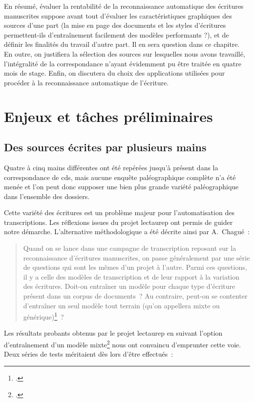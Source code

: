 \documentclass[a4paper,12pt,twoside]{book}
\begin{document}
			En résumé, évaluer la rentabilité de la reconnaissance automatique des écritures manuscrites suppose avant tout d'évaluer les caractéristiques graphiques des sources d'une part (la mise en page des documents et les styles d'écritures permettent-ils d'entraînement facilement des modèles performants ?), et de définir les finalités du travail d'autre part. Il en sera question dans ce chapitre. En outre, on justifiera la sélection des sources sur lesquelles nous avons travaillé, l'intégralité de la correspondance n'ayant évidemment pu être traitée en quatre mois de stage. Enfin, on discutera du choix des applications utilisées pour procéder à la reconnaissance automatique de l'écriture.
		
		\section{Enjeux et tâches préliminaires}
			
			\subsection{Des sources écrites par plusieurs mains}
				Quatre à cinq mains différentes ont été repérées jusqu'à présent dans la correspondance de \gls{cds}, mais aucune enquête paléographique complète n'a été menée et l'on peut donc supposer une bien plus grande variété paléographique dans l'ensemble des dossiers.
				
				Cette variété des écritures est un problème majeur pour l'automatisation des transcriptions. Les réflexions issues du projet \gls{lectaurep} ont permis de guider notre démarche. L'alternative méthodologique a été décrite ainsi par A.~Chagué~:
				
				\begin{quotation}
					Quand on se lance dans une campagne de transcription reposant sur la reconnaissance d’écritures manuscrites, on passe généralement par une série de questions qui sont les mêmes d’un projet à l’autre. Parmi ces questions, il y a celle des modèles de transcription et de leur rapport à la variation des écritures. Doit-on entraîner un modèle pour chaque type d’écriture présent dans un corpus de documents~? Au contraire, peut-on se contenter d’entraîner un seul modèle tout terrain (qu’on appellera mixte ou générique)\footcite{chagueCreationModelesTranscription}~?
				\end{quotation}
			
				Les résultats probants obtenus par le projet \gls{lectaurep} en suivant l'option d'entraînement d'un modèle mixte\footcite{chagueCreationModelesTranscriptiona} nous ont convaincu d'emprunter cette voie. Deux séries de tests méritaient dès lors d'être effectués~:
		
\end{document}

